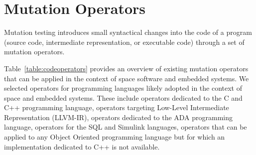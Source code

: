 
\section{Mutation Operators}
\label{sec:operators}

Mutation testing introduces small syntactical changes into the code of a program (source code, intermediate representation, or executable code) through a set of mutation operators.


Table~\ref{table:codeoperators} provides an overview of existing mutation operators that can be applied in the context of space software and embedded systems.
We selected operators for programming languages likely adopted in the context of space and embedded systems. These include operators dedicated to the C and C++ programming language, operators targeting Low-Level Intermediate Representation (LLVM-IR), operators dedicated to the ADA programming language, operators for the SQL and Simulink languages, operators that can be applied to any Object Oriented programming language but for which an implementation dedicated to C++ is not available.

